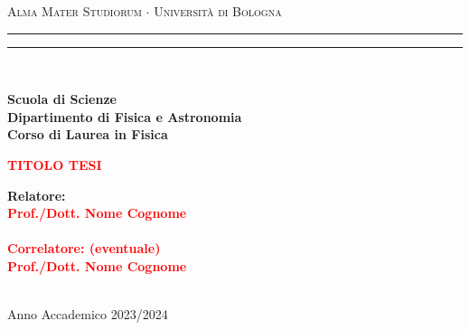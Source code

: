 \documentclass[12pt,a4paper,twoside]{report}
\begin{document}
	\begin{titlepage}
		\begin{center}
			{{\Large{\textsc{Alma Mater Studiorum $\cdot$ Universit\`a di Bologna}}}} 
			\rule[0.1cm]{15.8cm}{0.1mm}
			\rule[0.5cm]{15.8cm}{0.6mm}
			\\\vspace{3mm}
			
			{\small{\bf Scuola di Scienze \\ 
					Dipartimento di Fisica e Astronomia\\
					Corso di Laurea in Fisica}}
			
		\end{center}
		
		\vspace{23mm}
		
		\begin{center}\textcolor{red}{
				{\LARGE{\bf TITOLO TESI}}\\
		}\end{center}
		
		\vspace{50mm} \par \noindent
		
		\begin{minipage}[t]{0.47\textwidth}
			{\large{\bf Relatore: \vspace{2mm}\\\textcolor{red}{
						Prof./Dott. Nome Cognome}\\\\
					\textcolor{red}{
						\bf Correlatore: (eventuale)
						\vspace{2mm}\\
						Prof./Dott. Nome Cognome\\\\}}}
		\end{minipage}
		\hfill
		\begin{minipage}[t]{0.47\textwidth}
		\end{minipage}
		
		\vspace{40mm}
		
		\begin{center}
			Anno Accademico { 2023/2024}
		\end{center}
		
	\end{titlepage}
	\newpage
	\onehalfspacing %
\end{document}
